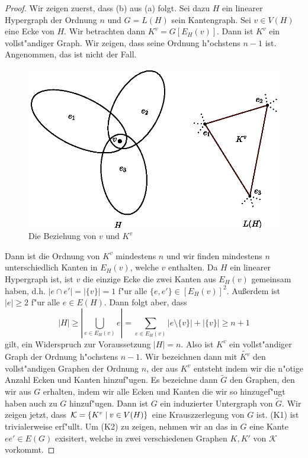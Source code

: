 \begin{proof}
  Wir zeigen zuerst, dass (b) aus (a) folgt. Sei dazu $H$ ein linearer Hypergraph der Ordnung $n$ und $G=L(H)$ sein Kantengraph. Sei $v\in V(H)$ eine Ecke von $H$. Wir betrachten dann $K^{v} = G[E_H(v)]$. Dann ist $K^{v}$ ein vollst"andiger Graph. Wir zeigen, dass seine Ordnung h"ochstens $n-1$ ist. Angenommen, das ist nicht der Fall. 
  \begin{figure}[h]
    \centering
    \includegraphics{images/KvLinegraph.eps}
    \caption{Die Beziehung von $v$ und $K^{v}$}
    \label{fig:kvlinegraph}
  \end{figure}
  Dann ist die Ordnung von $K^{v}$ mindestens $n$ und wir finden mindestens $n$ unterschiedlich Kanten in $E_H(v)$, welche $v$ enthalten. 
  Da $H$ ein linearer Hypergraph ist, ist $v$ die einzige Ecke die zwei Kanten aus $E_{H}(v)$ gemeinsam haben, d.h. $|e\cap e'| = |\{ v \}| = 1$ f"ur alle $\{e,e'\} \in [E_H(v)]^{2}$. Au{\ss}erdem ist $|e| \geq 2$ f"ur alle $e\in E(H)$. 
  Dann folgt aber, dass  $$|H| \geq |\bigcup\limits_{e\in E_H(v)} e| = \sum\limits_{e\in E_{H}(v)} |e\setminus \{v\}|+ | \{v\}| \geq n+1$$ gilt, ein Widerspruch zur Voraussetzung $|H| = n$. 
  Also ist $K^{v}$ ein vollst"andiger Graph der Ordnung h"ochstens $n-1$. Wir bezeichnen dann mit $\tilde{K^{v}}$ den vollst"andigen Graphen der Ordnung $n$, der aus $K^{v}$ entsteht indem wir die n"otige Anzahl Ecken und Kanten hinzuf"ugen. 
  Es bezeichne dann $\tilde{G}$ den Graphen, den wir aus $G$ erhalten, indem wir alle Ecken und Kanten die wir so hinzugef"ugt haben auch zu $G$ hinzuf"ugen. 
  Dann ist $G$ ein induzierter Untergraph von $\tilde{G}$. 
  Wir zeigen jetzt, dass $\mathcal{K}= \{K^{v} \;|\; v\in V(H) \}$ eine Krauszzerlegung von $G$ ist. 
  (K1) ist trivialerweise erf"ullt. Um (K2) zu zeigen, nehmen wir an das in $G$ eine Kante $ee'\in E(G)$ exisitert, welche in zwei verschiedenen Graphen $K,K'$ von $\mathcal{K}$ vorkommt.

\end{proof}
